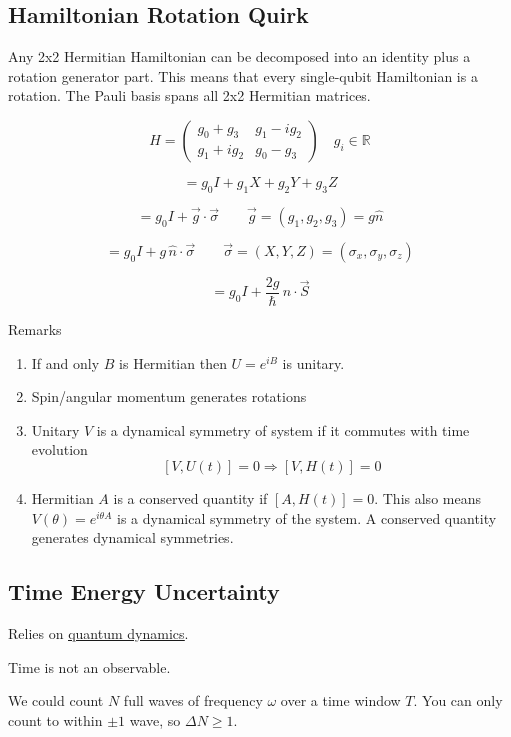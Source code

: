\documentclass[
]{article}
\let\oldhyperref\hyperref
\renewcommand{\hyperref}[2][]{\oldhyperref[#1]{\underline{#2}}}
\providecommand{\Rarr}{\Rightarrow}
\begin{document}
\subsection{Hamiltonian Rotation Quirk}\label{hamiltonian-rotation-quirk}

Any 2x2 Hermitian Hamiltonian can be decomposed into an identity plus a rotation generator part.
This means that every single-qubit Hamiltonian is a rotation. The Pauli basis spans all 2x2 Hermitian matrices.

\[ H = \begin{pmatrix} g_0 + g_3 & g_1 - ig_2 \\ g_1 + ig_2 & g_0 - g_3 \end{pmatrix} \quad g_i \in \mathbb{R} \]

\[ = g_0 I + g_1 X + g_2 Y + g_3 Z \]

\[ = g_0 I + \vec{g}\cdot\vec{\sigma} \qquad \vec{g} = (g_1, g_2, g_3) = g\hat{n} \]

\[ = g_0 I + g\,\hat{n}\cdot\vec{\sigma} \qquad \vec{\sigma} = (X, Y, Z) = (\sigma_x, \sigma_y, \sigma_z) \]

\[ = g_0 I + \frac{2g}{\hbar}\,\hat{n}\cdot\vec{S} \]


Remarks
\begin{enumerate}
	\item If and only $B$ is Hermitian then $U=e^{iB}$ is unitary.
	\item Spin/angular momentum generates rotations
	\item Unitary $V$ is a dynamical symmetry of system if it commutes with time evolution
	      \[
		      [V,U(t)]=0 \Rarr [V,H(t)]=0
	      \]
	\item Hermitian $A$ is a conserved quantity if $[A,H(t)]=0$. This also means $V(\theta)=e^{i\theta A}$ is a dynamical symmetry of the system. A conserved quantity generates dynamical symmetries.

\end{enumerate}

\subsection{Time Energy Uncertainty}\label{time-energy-uncertainty}
Relies on \hyperref[quantum-dynamics]{quantum dynamics}.

Time is not an observable.

We could count $N$ full waves of frequency $\omega$ over a time window $T$. You can only count to within $\pm 1$ wave, so $\Delta N\geq 1$.
\end{document}
